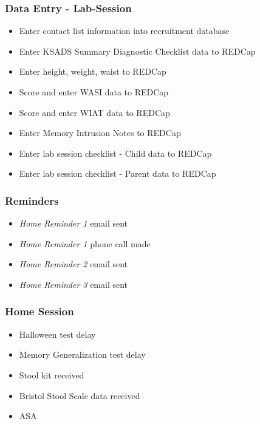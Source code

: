 \documentclass[
]{book}
\providecommand{\tightlist}{%
  \setlength{\itemsep}{0pt}\setlength{\parskip}{0pt}}
\begin{document}
\hypertarget{data-entry---lab-session}{%
\subsubsection{Data Entry - Lab-Session}\label{data-entry---lab-session}}

\begin{itemize}
\tightlist
\item
  Enter contact list information into recruitment database
\item
  Enter KSADS Summary Diagnostic Checklist data to REDCap
\item
  Enter height, weight, waist to REDCap
\item
  Score and enter WASI data to REDCap
\item
  Score and enter WIAT data to REDCap
\item
  Enter Memory Intrusion Notes to REDCap
\item
  Enter lab session checklist - Child data to REDCap
\item
  Enter lab session checklist - Parent data to REDCap
\end{itemize}

\hypertarget{reminders}{%
\subsubsection{Reminders}\label{reminders}}

\begin{itemize}
\tightlist
\item
  \emph{Home Reminder 1} email sent
\item
  \emph{Home Reminder 1} phone call made
\item
  \emph{Home Reminder 2} email sent
\item
  \emph{Home Reminder 3} email sent
\end{itemize}

\hypertarget{home-session}{%
\subsubsection{Home Session}\label{home-session}}

\begin{itemize}
\tightlist
\item
  Halloween test delay
\item
  Memory Generalization test delay
\item
  Stool kit received
\item
  Bristol Stool Scale data received
\item
  ASA
\end{itemize}
\end{document}
